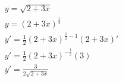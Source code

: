 \begin{ex}
\begin{align}
&y=\sqrt{2+3x}\nonumber\\
&y=(2+3x)^\frac{1}{2}\nonumber\\
&y'=\frac{1}{2}(2+3x)^{\frac{1}{2}-1}(2+3x)'\nonumber\\
&y'=\frac{1}{2}(2+3x)^{-\frac{1}{2}}(3)\nonumber\\
&y'=\frac{3}{2\sqrt{2+3x}}\nonumber
\end{align}
\end{ex}
